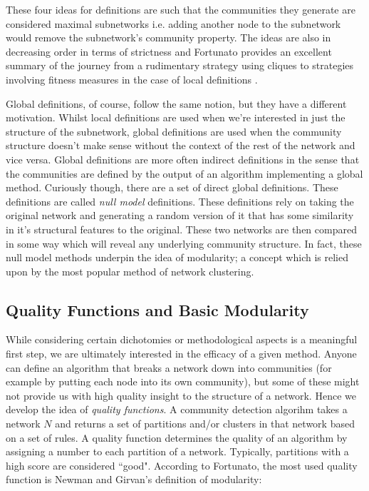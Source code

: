 These four ideas for definitions are such that the communities they generate are considered maximal subnetworks i.e. adding another node to the subnetwork would remove the subnetwork's community property. The ideas are also in decreasing order in terms of strictness and Fortunato provides an excellent summary of the journey from a rudimentary strategy using cliques to strategies involving fitness measures in the case of local definitions \cite[88-90]{fortunato}.

Global definitions, of course, follow the same notion, but they have a different motivation. Whilst local definitions are used when we're interested in just the structure of the subnetwork, global definitions are used when the community structure doesn't make sense without the context of the rest of the network and vice versa. Global definitions are more often indirect definitions in the sense that the communities are defined by the output of an algorithm implementing a global method. Curiously though, there are a set of direct global definitions. These definitions are called \emph{null model} definitions. These definitions rely on taking the original network and generating a random version of it that has some similarity in it's structural features to the original. These two networks are then compared in some way which will reveal any underlying community structure. In fact, these null model methods underpin the idea of modularity; a concept which is relied upon by the most popular method of network clustering.

\subsection{Quality Functions and Basic Modularity}\label{sec:qfs and modularity}

While considering certain dichotomies or methodological aspects is a meaningful first step, we are ultimately interested in the efficacy of a given method. Anyone can define an algorithm that breaks a network down into communities (for example by putting each node into its own community), but some of these might not provide us with high quality insight to the structure of a network. Hence we develop the idea of \emph{quality functions}. A community detection algorihm takes a network $N$ and returns a set of partitions and/or clusters in that network based on a set of rules. A quality function determines the quality of an algorithm by assigning a number to each partition of a network. Typically, partitions with a high score are considered ``good". According to Fortunato, the most used quality function is Newman and Girvan's definition of modularity\cite[8]{newman_girvan}:

